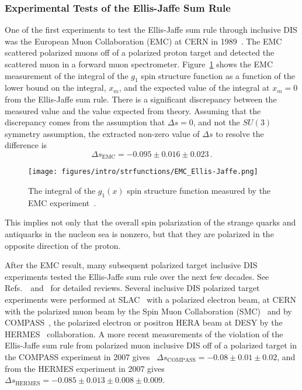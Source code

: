   \subsubsection{Experimental Tests of the Ellis-Jaffe Sum Rule}
  One of the first experiments to test the Ellis-Jaffe sum rule through
  inclusive DIS was the European Muon Collaboration (EMC) at CERN in
  1989~\cite{Ashman:1987hv,Ashman:1989ig}. The EMC scattered polarized muons
  off of a polarized proton target and detected the scattered muon in a forward
  muon spectrometer. Figure~\ref{fig:emcej} shows the EMC measurement of the
  integral of the $g_1$ spin structure function as a function of the lower
  bound on the integral, $x_m$, and the expected value of the integral at $x_m
  = 0$ from the Ellis-Jaffe sum rule. There is a significant discrepancy
  between the measured value and the value expected from theory. Assuming that
  the discrepancy comes from the assumption that $\Delta s = 0$, and not the
  $SU(3)$ symmetry assumption, the extracted non-zero value of $\Delta s$ to
  resolve the difference is
  \begin{equation*}
    \Delta s_{\textrm{EMC}} = -0.095 \pm 0.016 \pm 0.023 \,.
  \end{equation*}
  \begin{figure}[h]
    \centering
    \texttt{[image: figures/intro/strfunctions/EMC\_Ellis-Jaffe.png]}
    \caption{The integral of the $g_1(x)$ spin structure function measured by
      the EMC experiment~\cite{Ashman:1989ig}.}
    \label{fig:emcej}
  \end{figure}
  This implies not only that the overall spin polarization of the strange
  quarks and antiquarks in the nucleon sea is nonzero, but that they are
  polarized in the opposite direction of the proton.

  After the EMC result, many subsequent polarized target inclusive DIS
  experiments tested the Ellis-Jaffe sum rule over the next few decades.
  See Refs.~\cite{Aidala:2012mv}~and~\cite{Bass:2007zzb} for detailed reviews.
  Several inclusive DIS polarized target experiments were performed at
  SLAC~\cite{Baum:1983ha,Anthony:1996mw,Abe:1998wq} with a polarized electron
  beam, at CERN with the polarized muon beam by the Spin Muon Collaboration
  (SMC)~\cite{Adeva:1993km,Adeva:1998vv} and by
  COMPASS~\cite{Alexakhin:2006oza}, the polarized electron or positron HERA
  beam at DESY by the
  HERMES~\cite{Ackerstaff:1997ws,Ackerstaff:1999ey,Airapetian:2006vy}
  collaboration. A more recent measurements of the violation of the Ellis-Jaffe
  sum rule from polarized muon inclusive DIS off of a polarized target in the
  COMPASS experiment in 2007 gives~\cite{Alexakhin:2006oza} $\Delta
  s_{\textrm{COMPASS}} = -0.08 \pm 0.01 \pm 0.02$, and from the HERMES
  experiment in 2007 gives~\cite{Airapetian:2006vy} $\Delta s_{\textrm{HERMES}}
  = -0.085 \pm 0.013 \pm 0.008 \pm 0.009$.

